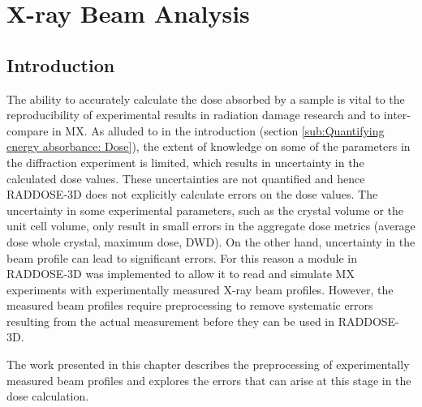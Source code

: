 \chapter{X-ray Beam Analysis}
\label{chap:X-ray Beam Analysis}

\section{Introduction}
\label{sec:Introduction - Beam chapter}
The ability to accurately calculate the dose absorbed by a sample is vital to the reproducibility of experimental results in radiation damage research and to inter-compare in MX.
As alluded to in the introduction (section \ref{sub:Quantifying energy absorbance: Dose}), the extent of knowledge on some of the parameters in the diffraction experiment is limited, which results in uncertainty in the calculated dose values.
These uncertainties are not quantified and hence RADDOSE-3D does not explicitly calculate errors on the dose values.
The uncertainty in some experimental parameters, such as the crystal volume or the unit cell volume, only result in small errors in the aggregate dose metrics (average dose whole crystal, maximum dose, DWD).
On the other hand, uncertainty in the beam profile can lead to significant errors.
For this reason a module in RADDOSE-3D was implemented to allow it to read and simulate MX experiments with experimentally measured X-ray beam profiles.
However, the measured beam profiles require preprocessing to remove systematic errors resulting from the actual measurement before they can be used in RADDOSE-3D.

The work presented in this chapter describes the preprocessing of experimentally measured beam profiles and explores the errors that can arise at this stage in the dose calculation.
